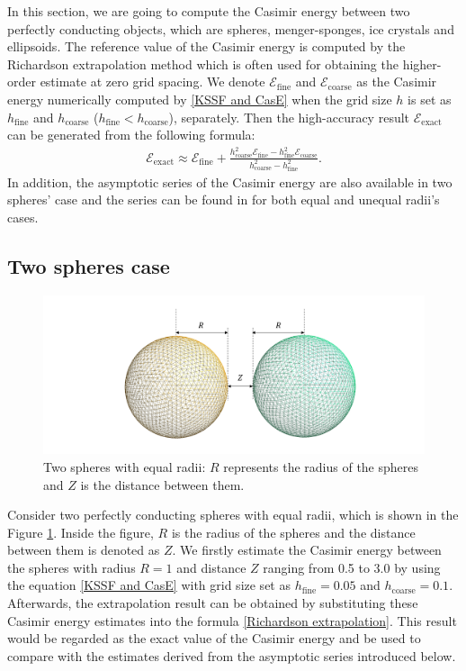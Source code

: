 In this section, we are going to compute the Casimir energy between two perfectly conducting objects, which are spheres, menger-sponges, ice crystals and 
ellipsoids. The reference value of the Casimir energy is computed by the Richardson extrapolation method which is often used 
for obtaining the higher-order estimate at zero grid spacing. We denote $\mathcal{E}_{\text{fine}}$ and $\mathcal{E}_{\text{coarse}}$ as the Casimir energy 
numerically computed by \eqref{KSSF and CasE} when the grid size $h$ is set as $h_{\text{fine}}$ and $h_{\text{coarse}}$ ($h_{\text{fine}}<h_{\text{coarse}}$), separately. Then the high-accuracy 
result $\mathcal{E}_{\text{exact}}$ can be generated from the following formula:
\begin{align}\label{Richardson extrapolation}
    \mathcal{E}_{\text{exact}} \approx \mathcal{E}_{\text{fine}} + \frac{h_{\text{coarse}}^{2}\mathcal{E}_{\text{fine}} - h_{\text{fine}}^{2}\mathcal{E}_{\text{coarse}}}{h_{\text{coarse}}^{2} - h_{\text{fine}}^{2}}.
\end{align}
In addition, the asymptotic series of the Casimir energy are also available in two spheres' case and the series can be found in \cite{emig2008casimir} 
for both equal and unequal radii's cases. 

\subsection{Two spheres case}
\begin{figure}[H]
    \includegraphics[scale = 0.6]{figures/Grid_two_spheres_dist.png}
    \caption{Two spheres with equal radii: $R$ represents the radius of the spheres and $Z$ is the distance between them.}
    \label{Two spheres with equal radii}
\end{figure}

Consider two perfectly conducting spheres with equal radii, which is shown in the Figure \ref{Two spheres with equal radii}. Inside the figure, $R$ is the radius 
of the spheres and the distance between them is denoted as $Z$. We firstly estimate the Casimir energy between the spheres with radius $R = 1$ and distance $Z$ 
ranging from 0.5 to 3.0 by using the equation \eqref{KSSF and CasE} with grid size set as $h_{\text{fine}} = 0.05$ and $h_{\text{coarse}} = 0.1$. Afterwards,
the extrapolation result can be obtained by substituting these Casimir energy estimates into the formula \eqref{Richardson extrapolation}. This result would be 
regarded as the exact value of the Casimir energy and be used to compare with the estimates derived from the asymptotic series introduced below. 

